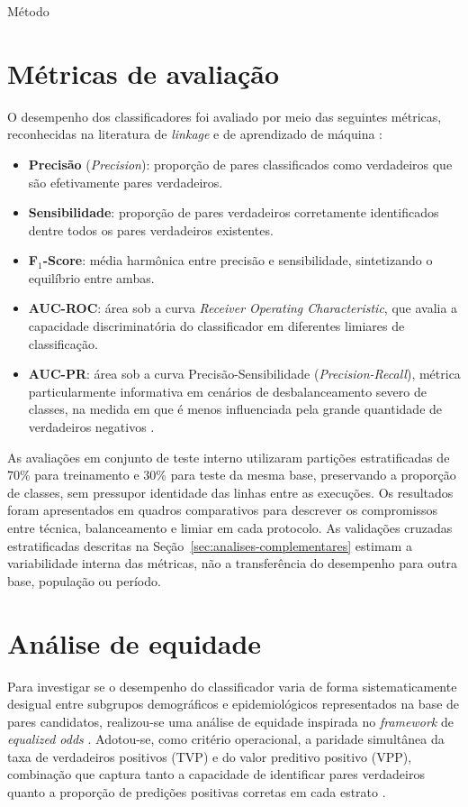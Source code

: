 \begin{chapter}{Método}
\section{Métricas de avaliação}\label{sec:metricas}

O desempenho dos classificadores foi avaliado por meio das seguintes métricas, reconhecidas na literatura de \textit{linkage} e de aprendizado de máquina \cite{Hand2018fmeasure, Hastie2009elements}:

\begin{itemize}
\item \textbf{Precisão} (\textit{Precision}): proporção de pares classificados como verdadeiros que são efetivamente pares verdadeiros.
\item \textbf{Sensibilidade}: proporção de pares verdadeiros corretamente identificados dentre todos os pares verdadeiros existentes.
\item \textbf{F$_1$-Score}: média harmônica entre precisão e sensibilidade, sintetizando o equilíbrio entre ambas.
\item \textbf{AUC-ROC}: área sob a curva \textit{Receiver Operating Characteristic}, que avalia a capacidade discriminatória do classificador em diferentes limiares de classificação.
\item \textbf{AUC-PR}: área sob a curva Precisão-Sensibilidade (\textit{Precision-Recall}), métrica particularmente informativa em cenários de desbalanceamento severo de classes, na medida em que é menos influenciada pela grande quantidade de verdadeiros negativos \cite{He2009imbalanced}.
\end{itemize}

As avaliações em conjunto de teste interno utilizaram partições estratificadas de 70\% para treinamento e 30\% para teste da mesma base, preservando a proporção de classes, sem pressupor identidade das linhas entre as execuções. Os resultados foram apresentados em quadros comparativos para descrever os compromissos entre técnica, balanceamento e limiar em cada protocolo. As validações cruzadas estratificadas descritas na Seção~\ref{sec:analises-complementares} estimam a variabilidade interna das métricas, não a transferência do desempenho para outra base, população ou período.

\section{Análise de equidade}\label{sec:analise-equidade}

Para investigar se o desempenho do classificador varia de forma sistematicamente desigual entre subgrupos demográficos e epidemiológicos representados na base de pares candidatos, realizou-se uma análise de equidade inspirada no \textit{framework} de \textit{equalized odds} \cite{Hardt2016equality}. Adotou-se, como critério operacional, a paridade simultânea da taxa de verdadeiros positivos (TVP) e do valor preditivo positivo (VPP), combinação que captura tanto a capacidade de identificar pares verdadeiros quanto a proporção de predições positivas corretas em cada estrato \cite{Barocas2019fairml}.


\end{chapter}
